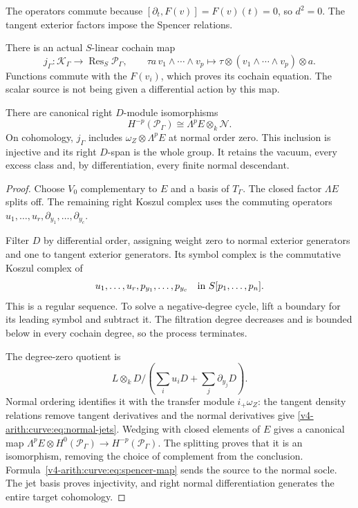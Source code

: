 The operators commute because
$[\partial_t,F(v)]=F(v)(t)=0$, so $d^2=0$.
The tangent exterior factors impose the Spencer relations.

There is an actual $S$-linear cochain map
\begin{equation}\label{v4-arith:curve:eq:spencer-map}
 j_\Gamma:\mathcal K_\Gamma\longrightarrow\operatorname{Res}_S\mathcal P_\Gamma,
 \qquad
 \tau a\,v_1\wedge\cdots\wedge v_p
 \longmapsto\tau\otimes(v_1\wedge\cdots\wedge v_p)\otimes a .
\end{equation}
Functions commute with the $F(v_i)$, which proves its cochain
equation. The scalar source is not being given a differential
action by this map.

\begin{theorem}\label{v4-arith:curve:thm:spencer}
There are canonical right $D$-module isomorphisms
\[
 H^{-p}(\mathcal P_\Gamma)\cong\Lambda^pE\otimes_k\mathcal N.
\]
On cohomology, $j_\Gamma$ includes
$\omega_Z\otimes\Lambda^pE$ at normal order zero. This inclusion
is injective and its right $D$-span is the whole group.
It retains the vacuum, every excess class and, by differentiation,
every finite normal descendant.
\end{theorem}
\begin{proof}
Choose $V_0$ complementary to $E$ and a basis of $T_\Gamma$.
The closed factor $\Lambda E$ splits off.
The remaining right Koszul complex uses the commuting operators
$u_1,\ldots,u_r,\partial_{y_1},\ldots,\partial_{y_c}$.

Filter $D$ by differential order, assigning weight zero to
normal exterior generators and one to tangent exterior generators.
Its symbol complex is the commutative Koszul complex of
\[
 u_1,\ldots,u_r,p_{y_1},\ldots,p_{y_c}
 \quad\hbox{in }S[p_1,\ldots,p_n].
\]
This is a regular sequence. To solve a negative-degree cycle,
lift a boundary for its leading symbol and subtract it.
The filtration degree decreases and is bounded below in every
cochain degree, so the process terminates.

The degree-zero quotient is
\[
 L\otimes_kD\big/\left(\sum_i u_iD+\sum_j\partial_{y_j}D\right).
\]
Normal ordering identifies it with the transfer module
$i_+\omega_Z$: the tangent density relations remove tangent
derivatives and the normal derivatives give
\eqref{v4-arith:curve:eq:normal-jets}.
Wedging with closed elements of $E$ gives a canonical map
$\Lambda^pE\otimes H^0(\mathcal P_\Gamma)\to H^{-p}(\mathcal P_\Gamma)$.
The splitting proves that it is an isomorphism, removing the
choice of complement from the conclusion.
Formula~\eqref{v4-arith:curve:eq:spencer-map} sends the source to
the normal socle. The jet basis proves injectivity, and right
normal differentiation generates the entire target cohomology.
\end{proof}

